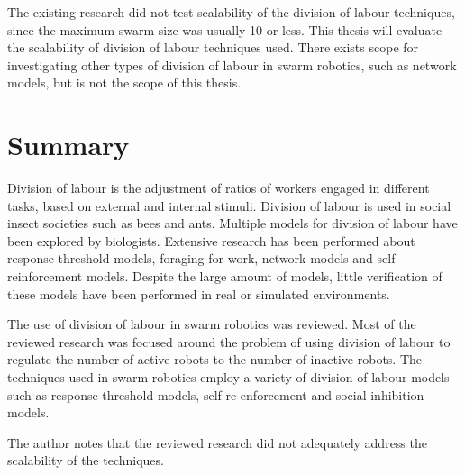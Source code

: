 The existing research did not test scalability of the division of labour techniques, since the maximum swarm size was usually 10 or less. This thesis will evaluate the scalability of division of labour techniques used. There exists scope for investigating other types of division of labour in swarm robotics, such as network models, but is not the scope of this thesis.


\section{Summary}
\label{sec:second:summary}
Division of labour is the adjustment of ratios of workers engaged in different tasks, based on external and internal stimuli. Division of labour is used in social insect societies such as bees and ants. Multiple models for division of labour have been explored by biologists. Extensive research has been performed about response threshold models, foraging for work, network models and self-reinforcement models. Despite the large amount of models, little verification of these models have been performed in real or simulated environments. 

The use of division of labour in swarm robotics was reviewed. Most of the reviewed research was focused around the problem of using division of labour to regulate the number of active robots to the number of inactive robots. The techniques used in swarm robotics employ a variety of division of labour models such as response threshold models, self re-enforcement and social inhibition models. 

The author notes that the reviewed research did not adequately address the scalability of the techniques.
